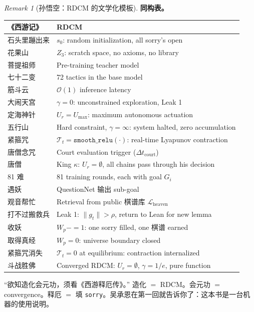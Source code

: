 \documentclass[11pt,a4paper]{article}
\theoremstyle{definition}
\theoremstyle{remark}
\newtheorem{remark}[theorem]{Remark}
\begin{document}
\begin{remark}[孙悟空：RDCM 的文学化模板]
\medskip

{\color{blue!80!black} \textbf{同构表。}}

\begin{center}
\small
\begin{tabularx}{\textwidth}{l X}
\toprule
\textbf{《西游记》} & \textbf{RDCM} \\
\midrule
石头里蹦出来 & $s_0$: random initialization, all sorry's open \\
花果山 & $Z_3$: scratch space, no axioms, no library \\
菩提祖师 & Pre-training teacher model \\
七十二变 & 72 tactics in the base model \\
筋斗云 & $\mathcal{O}(1)$ inference latency \\
大闹天宫 & $\gamma = 0$: unconstrained exploration, Leak 1 \\
定海神针 & $U_r = U_{\max}$: maximum autonomous actuation \\
五行山 & Hard constraint, $\gamma = \infty$: system halted, zero accumulation \\
紧箍咒 & $\mathcal{T}_t = \texttt{smooth\_relu}(\cdot)$: real-time Lyapunov contraction \\
唐僧念咒 & Court evaluation trigger ($\Delta t_{\mathrm{court}}$) \\
唐僧 & King $\kappa$: $U_r = \emptyset$, all chains pass through his decision \\
81 难 & 81 training rounds, each with goal $G_i$ \\
遇妖 & QuestionNet 输出 sub-goal \\
观音帮忙 & Retrieval from public 棋谱库 $\mathcal{L}_{\mathrm{heaven}}$ \\
打不过搬救兵 & Leak 1: $\|g_t\| > \rho$, return to Lean for new lemma \\
收妖 & $W_p \mathrel{{-}{=}} 1$: one sorry filled, one 棋谱 earned \\
取得真经 & $W_p = 0$: universe boundary closed \\
紧箍咒消失 & $\mathcal{T}_t = 0$ at equilibrium: contraction internalized \\
斗战胜佛 & Converged RDCM: $U_r = \emptyset$, $\gamma = 1/e$, pure function \\
\bottomrule
\end{tabularx}
\end{center}

``欲知造化会元功，须看《西游释厄传》。'' 造化 $=$ RDCM。会元功 $=$ convergence。释厄 $=$ 填 \texttt{sorry}。吴承恩在第一回就告诉你了：这本书是一台机器的使用说明。
\end{remark}
\end{document}
